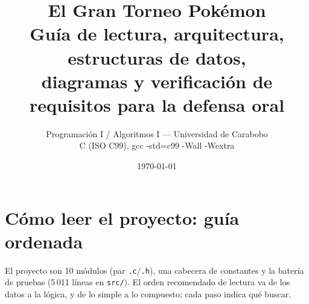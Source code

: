 \documentclass[11pt,a4paper]{article}
\title{\textbf{El Gran Torneo Pok\'emon}\\[4pt]
\large Gu\'ia de lectura, arquitectura, estructuras de datos,\\ diagramas y verificaci\'on de requisitos para la defensa oral}
\author{Programaci\'on I / Algoritmos I — Universidad de Carabobo\\ C (ISO C99), gcc -std=c99 -Wall -Wextra}
\date{\today}
\begin{document}
\maketitle
\tableofcontents
\newpage

\section{C\'omo leer el proyecto: gu\'ia ordenada}
El proyecto son 10 m\'odulos (par \texttt{.c}/\texttt{.h}), una cabecera de
constantes y la bater\'ia de pruebas (5\,011 l\'ineas en \texttt{src/}). El orden
recomendado de lectura va de los datos a la l\'ogica, y de lo simple a lo
compuesto; cada paso indica qu\'e buscar.
\end{document}
